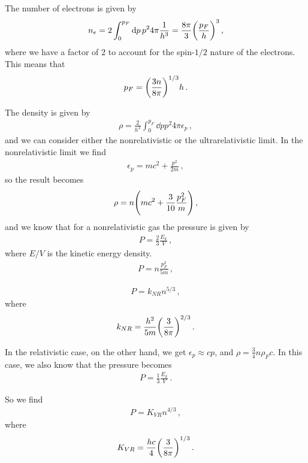\documentclass[main.tex]{subfiles}
\begin{document}
The number of electrons is given by 
%
\begin{align}
  n_e = 2 \int_{0}^{p_F} \dd{p} p^2 4 \pi \frac{1}{h^3}
  = \frac{8 \pi }{3} \qty(\frac{p_F}{h})^{3}
\,,
\end{align}
%
where we have a factor of \(2\) to account for the spin-\(1/2\) nature of the electrons. 
This means that 
%
\begin{align}
  p_F = \qty(\frac{3n}{8 \pi })^{1/3} h
\,.
\end{align}

The density is given by 
%
\begin{align}
  \rho = \frac{2}{h^3} \int_{0}^{p_F} \dd{p} p^2 4 \pi \epsilon _p
\,,
\end{align}
%
and we can consider either the nonrelativistic or the ultrarelativistic limit. In the nonrelativistic limit we find 
%
\begin{align}
  \epsilon _p = mc^2 + \frac{p^2}{2m}
\,,
\end{align}
%
so the result becomes 
%
\begin{align}
  \rho = n \qty(mc^2 + \frac{3}{10} \frac{p_F^2}{m})
\,,
\end{align}
%
and we know that for a nonrelativistic gas the pressure is given by 
%
\begin{align}
  P  = \frac{2}{3} \frac{E_k}{V}
\,,
\end{align}
%
where \(E/V\) is the kinetic energy density. 
%
\begin{align}
  P = n \frac{p_F^2}{5m}
\,,
\end{align}
%


%
\begin{align}
  P = k_{NR} n^{5/3}
\,,
\end{align}
%
where 
%
\begin{align}
  k_{NR} = \frac{h^2}{5m} \qty(\frac{3}{8 \pi })^{2/3}
\,.
\end{align}
%

In the relativistic case, on the other hand, we get \(\epsilon _p \approx cp\), and \(\rho = \frac{3}{4} n \rho _F c \). 
In this case, we also know that the pressure becomes 
%
\begin{align}
  P = \frac{1}{3} \frac{E_k}{V}
\,.
\end{align}

So we find 
%
\begin{align}
P = K_{VR} n^{4/3} 
\,,
\end{align}
%
where 
%
\begin{align}
  K_{VR} = \frac{hc}{4} \qty(\frac{3}{8 \pi })^{1/3}
\,.
\end{align}
\end{document}
